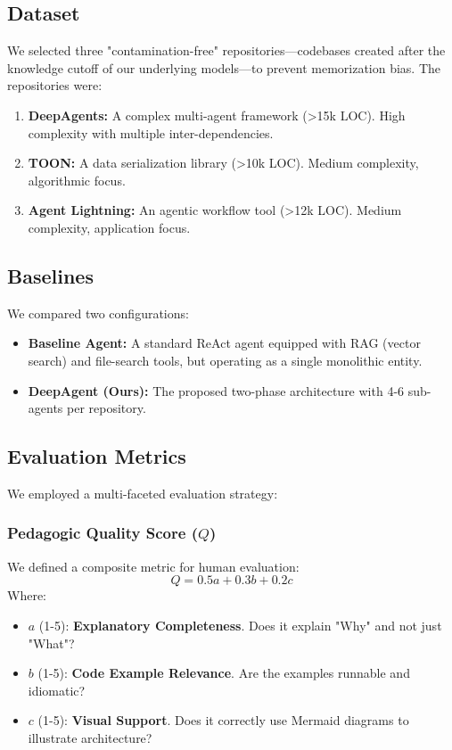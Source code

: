 \documentclass[conference]{IEEEtran}
\begin{document}
\subsection{Dataset}
We selected three "contamination-free" repositories---codebases created after the knowledge cutoff of our underlying models---to prevent memorization bias. The repositories were:
\begin{enumerate}
    \item \textbf{DeepAgents:} A complex multi-agent framework (>15k LOC). High complexity with multiple inter-dependencies.
    \item \textbf{TOON:} A data serialization library (>10k LOC). Medium complexity, algorithmic focus.
    \item \textbf{Agent Lightning:} An agentic workflow tool (>12k LOC). Medium complexity, application focus.
\end{enumerate}

\subsection{Baselines}
We compared two configurations:
\begin{itemize}
    \item \textbf{Baseline Agent:} A standard ReAct agent equipped with RAG (vector search) and file-search tools, but operating as a single monolithic entity.
    \item \textbf{DeepAgent (Ours):} The proposed two-phase architecture with 4-6 sub-agents per repository.
\end{itemize}

\subsection{Evaluation Metrics}
We employed a multi-faceted evaluation strategy:

\subsubsection{Pedagogic Quality Score (\texorpdfstring{$Q$}{Q})}
We defined a composite metric for human evaluation:
\begin{equation}
Q = 0.5a + 0.3b + 0.2c
\end{equation}
Where:
\begin{itemize}
    \item $a$ (1-5): \textbf{Explanatory Completeness}. Does it explain "Why" and not just "What"?
    \item $b$ (1-5): \textbf{Code Example Relevance}. Are the examples runnable and idiomatic?
    \item $c$ (1-5): \textbf{Visual Support}. Does it correctly use Mermaid diagrams to illustrate architecture?
\end{itemize}
\end{document}
